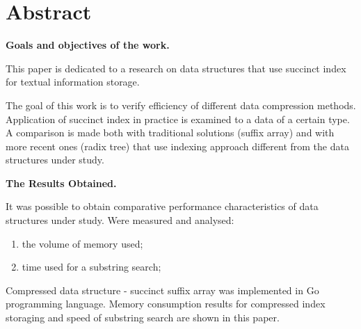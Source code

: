 \newpage
\section*{Abstract}

\textbf{Goals and objectives of the work.}

This paper is dedicated to a research on data structures that use succinct index for textual information storage.

The goal of this work is to verify efficiency of different data compression methods.
Application of succinct index in practice is examined to a data of a certain type.
A comparison is made both with traditional solutions (suffix array) and with more recent ones (radix tree)
that use indexing approach different from the data structures under study.

\textbf{The Results Obtained.}

It was possible to obtain comparative performance characteristics of data structures under study.
Were measured and analysed:
\begin{enumerate}
    \item the volume of memory used;
    \item time used for a substring search;
\end{enumerate}

Compressed data structure - succinct suffix array was implemented in Go programming language.
Memory consumption results for compressed index storaging and speed of substring search are shown in this paper.
